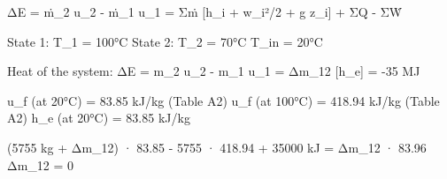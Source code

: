 ΔE = ṁ_2 u_2 - ṁ_1 u_1 = Σṁ [h_i + w_i²/2 + g z_i] + ΣQ - ΣẆ  

State 1:  
T_1 = 100°C  
State 2:  
T_2 = 70°C  
T_in = 20°C  

Heat of the system:  
ΔE = m_2 u_2 - m_1 u_1 = Δm_12 [h_e] = -35 MJ  

u_f (at 20°C) = 83.85 kJ/kg (Table A2)  
u_f (at 100°C) = 418.94 kJ/kg (Table A2)  
h_e (at 20°C) = 83.85 kJ/kg  

(5755 kg + Δm_12) · 83.85 - 5755 · 418.94 + 35000 kJ = Δm_12 · 83.96  
Δm_12 = 0